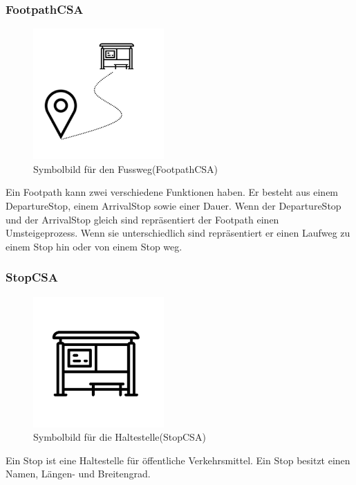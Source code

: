 \subsubsection{FootpathCSA}
\begin{figure}[htb]
	\centering
	\includegraphics[width=5cm]{img/footpath.png}
	\caption{Symbolbild für den Fussweg(FootpathCSA)}
	\label{fig:footpath}
\end{figure}
Ein Footpath kann zwei verschiedene Funktionen haben. Er besteht aus einem DepartureStop, einem ArrivalStop sowie einer Dauer. Wenn der DepartureStop und der ArrivalStop gleich sind repräsentiert der Footpath einen Umsteigeprozess. Wenn sie unterschiedlich sind repräsentiert er einen Laufweg zu einem Stop hin oder von einem Stop weg.


\subsubsection{StopCSA}
\begin{figure}[htb]
	\centering
	\includegraphics[width=5cm]{img/stop.png}
	\caption{Symbolbild für die Haltestelle(StopCSA)}
	\label{fig:stop}
\end{figure}
Ein Stop ist eine Haltestelle für öffentliche Verkehrsmittel. Ein Stop besitzt einen Namen, Längen- und Breitengrad. 

